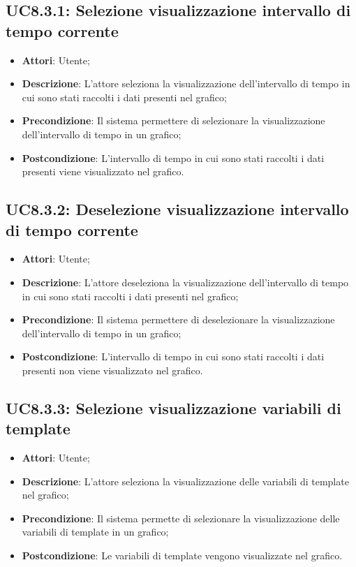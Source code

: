 \subsection{UC8.3.1: Selezione visualizzazione intervallo di tempo corrente}
\hypertarget{UC8.3.1}{}
\begin{itemize}
	\item \textbf{Attori}: Utente;
	\item \textbf{Descrizione}: L'attore seleziona la visualizzazione dell'intervallo di tempo in cui sono stati raccolti i dati presenti nel grafico;
	\item \textbf{Precondizione}: Il sistema permettere di selezionare la visualizzazione dell'intervallo di tempo in un grafico;
	\item \textbf{Postcondizione}: L'intervallo di tempo in cui sono stati raccolti i dati presenti viene visualizzato nel grafico.
\end{itemize}

\subsection{UC8.3.2: Deselezione visualizzazione intervallo di tempo corrente}
\hypertarget{UC8.3.2}{}
\begin{itemize}
	\item \textbf{Attori}: Utente;
	\item \textbf{Descrizione}: L'attore deseleziona la visualizzazione dell'intervallo di tempo in cui sono stati raccolti i dati presenti nel grafico;
	\item \textbf{Precondizione}: Il sistema permettere di deselezionare la visualizzazione dell'intervallo di tempo in un grafico;
	\item \textbf{Postcondizione}: L'intervallo di tempo in cui sono stati raccolti i dati presenti non viene visualizzato nel grafico.
\end{itemize}

\subsection{UC8.3.3: Selezione visualizzazione variabili di template}
\hypertarget{UC8.3.3}{}
\begin{itemize}
	\item \textbf{Attori}: Utente;
	\item \textbf{Descrizione}: L'attore seleziona la visualizzazione delle variabili di template nel grafico;
	\item \textbf{Precondizione}: Il sistema permette di selezionare la visualizzazione delle variabili di template in un grafico;
	\item \textbf{Postcondizione}: Le variabili di template vengono visualizzate nel grafico.
\end{itemize}


